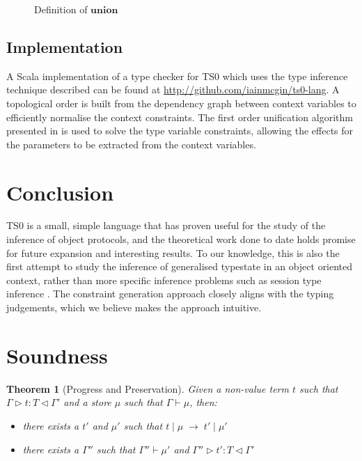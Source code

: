 \documentclass[preprint]{sigplanconf}
\newtheorem{thm}{Theorem}
\newcommand{\typerule}[4]{#1 \triangleright #2 : #3 \triangleleft #4}
\newcommand{\oprule}[4]{#1 \mid #2\;\longrightarrow\;#3 \mid #4}
\begin{document}
\begin{figure}

\caption{\label{fig:overlaydefn} Definition of $\mathbf{union}$}
\end{figure}


\subsection{Implementation}

A Scala implementation of a type checker for TS0 which uses the type inference
technique described can be found at \url{http://github.com/iainmcgin/ts0-lang}.
A topological order is built from the dependency graph between context variables
to efficiently normalise the context constraints. The first order unification 
algorithm presented in \cite{Martelli1982} is used to solve the type variable 
constraints, allowing the effects for the parameters to be extracted from
the context variables.

\section{Conclusion}

TS0 is a small, simple language that has proven useful
for the study of the inference of object protocols, and the theoretical work
done to date holds promise for future expansion and interesting results. 
To our knowledge, this is also the first attempt to study the inference
of generalised typestate in an object oriented context, rather than
more specific inference problems such as session type inference
\cite{Collingbourne2010}. The
constraint generation approach closely aligns with the typing judgements,
which we believe makes the approach intuitive.

\appendix

\section{Soundness}
\label{app:soundness}



\begin{thm}[Progress and Preservation]
\label{thm:soundness}
Given a non-value term $t$ such that $\typerule{\Gamma}{t}{T}{\Gamma'}$
and a store $\mu$ such that $\Gamma \vdash \mu$, then:

\begin{itemize}
\item there exists a $t'$ and $\mu'$ such that
$\oprule{t}{\mu}{t'}{\mu'}$
\item there exists a $\Gamma''$ such that
$\Gamma'' \vdash \mu'$ and $\typerule{\Gamma''}{t'}{T}{\Gamma'}$
\end{itemize}
\end{thm}
\end{document}
